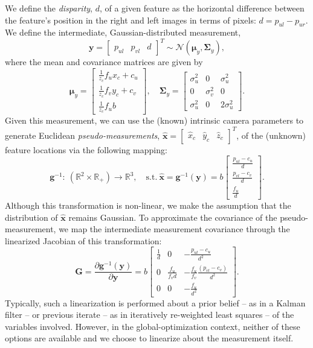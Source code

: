\documentclass[lettersize,journal]{IEEEtran}
\begin{document}
We define the \textit{disparity}, $ d $, of a given feature as the horizontal difference between the feature's position in the right and left images in terms of pixels: $ d = p_{ul} - p_{ur} $. We define the intermediate, Gaussian-distributed measurement, 
\begin{equation}
	\bm{y} = \begin{bmatrix}p_{ul}&p_{vl}&d\end{bmatrix}^T \sim \mathcal{N}(\bm{\mu}_y, \bm{\Sigma}_y),
\end{equation}
where the mean and covariance matrices are given by
\begin{equation}
	\bm{\mu}_y = \begin{bmatrix}
		\frac{1}{z_c}f_u x_c + c_u \\ \frac{1}{z_c}f_v y_c + c_v \\ \frac{1}{z_c}f_u b
	\end{bmatrix},\quad \bm{\Sigma}_y = \begin{bmatrix}
		\sigma_u^2 & 0 & \sigma_u^2\\
		0 & \sigma_v^2 & 0 \\
		\sigma_u^2 & 0 & 2\sigma_u^2
	\end{bmatrix}.
\end{equation}
Given this measurement, we can use the (known) intrinsic camera parameters to generate Euclidean \textit{pseudo-measurements}, $ \hat{\bm{x}} = \begin{bmatrix}\hat{x}_c &\hat{y}_c & \hat{z}_c \end{bmatrix}^T $, of the (unknown) feature locations via the following mapping:
\begin{equation}
	\bm{g}^{-1}:~(\mathbb{R}^2\times\mathbb{R}_+) \rightarrow \mathbb{R}^3, \quad \mbox{s.t.}~\hat{\bm{x}} = \bm{g}^{-1}(\bm{y})=b\begin{bmatrix}
	 	\frac{p_{ul}-c_u}{d} \\ \frac{p_{vl}-c_v}{d} \\ \frac{f_u}{d} 
	 \end{bmatrix}.
\end{equation}
Although this transformation is non-linear, we make the assumption that the distribution of $ \hat{\bm{x}} $ remains Gaussian. To approximate the covariance of the pseudo-measurement, we map the intermediate measurement covariance through the linearized Jacobian of this transformation:
\begin{equation}
	\bm{G} = \frac{\partial \bm{g}^{-1}(\bm{y})}{\partial \bm{y}} = b\begin{bmatrix}
		\frac{1}{d} & 0 & -\frac{p_{ul} - c_u}{d^2} \\
		0 & \frac{f_u}{f_v d} & -\frac{f_u}{f_v }\frac{(p_{vl} - c_v)}{d^2} \\
		0 & 0 & -\frac{f_u}{d^2}
	\end{bmatrix}.
\end{equation}
Typically, such a linearization is performed about a prior belief -- as in a Kalman filter -- or previous iterate -- as in iteratively re-weighted least squares --  of the variables involved. However, in the global-optimization context, neither of these options are available and we choose to linearize about the measurement itself. 
\end{document}
